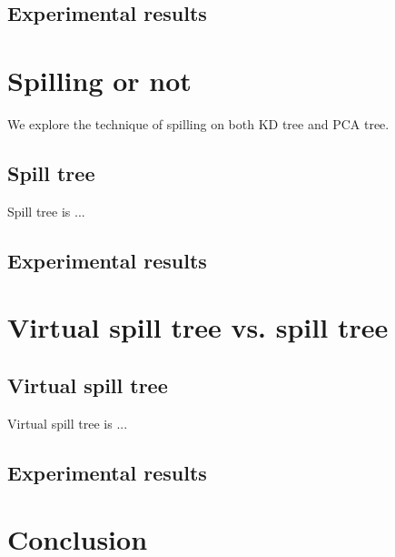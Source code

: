 \documentclass[paper=letter, fontsize=12pt]{article} %
\begin{document}
\subsection{Experimental results}



\section{Spilling or not}
We explore the technique of spilling on both KD tree and PCA tree.

\subsection{Spill tree}
Spill tree is ...

\subsection{Experimental results}



\section{Virtual spill tree vs. spill tree}

\subsection{Virtual spill tree}
Virtual spill tree is ...

\subsection{Experimental results}


\section{Conclusion}
\end{document}
